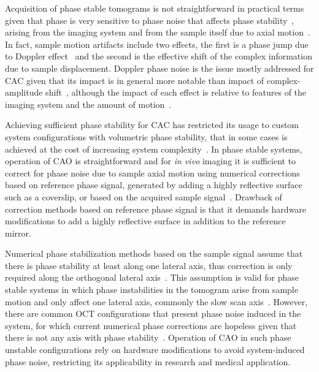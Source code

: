 Acquisition of phase stable tomograms is not straightforward in practical terms given that phase is very sensitive to phase noise that affects phase stability~\cite{Shemonski2014_Stability, Vakoc2005_Phaseresolved}, arising from the imaging system and from the sample itself due to axial motion~\cite{Shemonski2014_Stability-1, Shemonski2014_Threedimensional}. In fact, sample motion artifacts include two effects, the first is a phase jump due to Doppler effect~\cite{Chen1997_Optical, White2003_vivo} and the second is the effective shift of the complex information due to sample displacement. Doppler phase noise is the issue mostly addressed for CAC given that its impact is in general more notable than impact of complex-amplitude shift~\cite{Shemonski2014_Stability-1, Shemonski2014_Threedimensional}, although the impact of each effect is relative to features of the imaging system and the amount of motion~\cite{Shemonski2014_Stability}.

Achieving sufficient phase stability for CAC has restricted its usage to custom system configurations with volumetric phase stability, that in some cases is achieved at the cost of increasing system complexity~\cite{Ginner2018_Holographic, Kumar2013_Subaperture, Hillmann2016_Aberrationfree, Sudkamp2018_Simple}. In phase stable systems, operation of CAO is straightforward and for \textit{in vivo} imaging it is sufficient to correct for phase noise due to sample axial motion using numerical corrections based on reference phase signal, generated by adding a highly reflective surface such as a coverslip, or based on the acquired sample signal~\cite{White2003_vivo, Ralston2006_Phase}. Drawback of correction methods based on reference phase signal is that it demands hardware modifications to add a highly reflective surface in addition to the reference mirror.

Numerical phase stabilization methods based on the sample signal assume that there is phase stability at least along one lateral axis, thus correction is only required along the orthogonal lateral axis~\cite{Shemonski2014_Threedimensional}. This assumption is valid for phase stable systems in which phase instabilities in the tomogram arise from sample motion and only affect one lateral axis, commonly the slow scan axis~\cite{Shemonski2014_Threedimensional}. However, there are common OCT configurations that present phase noise induced in the system, for which current numerical phase corrections are hopeless given that there is not any axis with phase stability~\cite{Vakoc2005_Phaseresolved}. Operation of CAO in such phase unstable configurations rely on hardware modifications to avoid system-induced phase noise, restricting its applicability in research and medical application.

